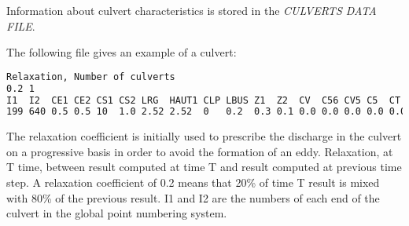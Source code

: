  Information about culvert characteristics is stored in the \textit{CULVERTS DATA FILE}.

 The following file gives an example of a culvert:
\begin{lstlisting}[language=bash]
Relaxation, Number of culverts
0.2 1
I1  I2  CE1 CE2 CS1 CS2 LRG  HAUT1 CLP LBUS Z1  Z2  CV  C56 CV5 C5  CT  HAUT2 FRIC LENGTH CIRC D1  D2 A1 A2  AA
199 640 0.5 0.5 10  1.0 2.52 2.52  0   0.2  0.3 0.1 0.0 0.0 0.0 0.0 0.0 2.52  0.0  0.0    1    90. 0. 0. 90. 0

\end{lstlisting}
 The relaxation coefficient is initially used to prescribe the discharge in the culvert on a progressive basis in order to avoid the formation of an eddy. Relaxation, at T time, between result computed at time T and result computed at previous time step. A relaxation coefficient of 0.2 means that 20\% of time T result is mixed with 80\% of the previous result. I1 and I2 are the numbers of each end of the culvert in the global point numbering system.


